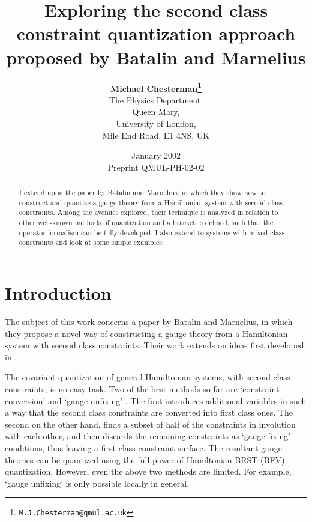 \documentclass[a4paper,12pt]{article}
\theoremstyle{definition}
\theoremstyle{remark}
\numberwithin{equation}{section}
\begin{document}
\title{Exploring the second class constraint quantization approach
proposed by Batalin and Marnelius}

\author{{\bf Michael Chesterman\footnote{\texttt{M.J.Chesterman@qmul.ac.uk}}}\\ {\small The Physics
Department,}\\{\small Queen Mary,}\\ \small{University of London,}
\\ {\small Mile End Road, E1 4NS, UK}}


\date{January 2002\\{\small Preprint QMUL-PH-02-02}}

\maketitle



\begin{abstract}
I extend upon the paper by Batalin and Marnelius, in which they
show how to construct and quantize a gauge theory from a
Hamiltonian system with second class constraints. Among
the avenues explored, their technique is analyzed in relation to
other well-known methods of quantization and a bracket is defined,
such that the operator formalism can be fully developed. I also
extend to systems with mixed class constraints and look at some
simple examples.
\end{abstract}

\section{Introduction}

The subject of this work concerns a paper \cite{Batalin:2001hs} by
Batalin and Marnelius, in which they propose a novel way of
constructing a gauge theory from a Hamiltonian system with second
class constraints. Their work extends on ideas first developed in
\cite{Lyakhovich:2001cm}.

The covariant quantization of general Hamiltonian systems, with
second class constraints, is no easy task. Two of the best methods
so far are `constraint conversion'
\cite{Batalin:1987fm,Batalin:1990mb,Batalin:1991jm} and `gauge
unfixing' \cite{Harada:1990aj,Mitra:1990mp}. The first
introduces additional variables in such a way that the second class
constraints are converted into first class ones. The second on the
other hand, finds a subset of half of the constraints in involution
with each other, and then discards the remaining constraints as
`gauge fixing' conditions, thus leaving a first class constraint
surface. The resultant gauge theories can be quantized using the
full power of Hamiltonian BRST (BFV) quantization. However, even
the above two methods are limited. For example, `gauge unfixing' is
only possible locally in general.
\end{document}
